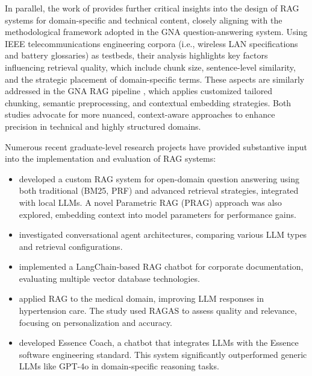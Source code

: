 \begin{spacing}{1.5}
In parallel, the work of \citep{soman_observations_2024} provides further critical insights into the design of RAG systems for domain-specific and technical content, closely aligning with the methodological framework adopted in the GNA question-answering system. Using IEEE telecommunications engineering corpora (i.e., wireless LAN specifications and battery glossaries) as testbeds, their analysis highlights key factors influencing retrieval quality, which include chunk size, sentence-level similarity, and the strategic placement of domain-specific terms. These aspects are similarly addressed in the GNA RAG pipeline \citep{pograri_question-answering_2025}, which applies customized tailored chunking, semantic preprocessing, and contextual embedding strategies. Both studies advocate for more nuanced, context-aware approaches to enhance precision in technical and highly structured domains.

Numerous recent graduate-level research projects have provided substantive input into the implementation and evaluation of RAG systems:
\begin{itemize}
    \item \textcite{antolini_experimental_2025} developed a custom RAG system for open-domain question answering using both traditional (BM25, PRF) and advanced retrieval strategies, integrated with local LLMs. A novel Parametric RAG (PRAG) approach was also explored, embedding context into model parameters for performance gains.
    \item \textcite{caramanna_progettazione_2024} investigated conversational agent architectures, comparing various LLM types and retrieval configurations.
    \item \textcite{florio_progettazione_2024} implemented a LangChain-based RAG chatbot for corporate documentation, evaluating multiple vector database technologies.
    \item \textcite{salcuni_utilizzo_2025} applied RAG to the medical domain, improving LLM responses in hypertension care. The study used RAGAS to assess quality and relevance, focusing on personalization and accuracy.
    \item \textcite{nicoletti_llms_2025} developed Essence Coach, a chatbot that integrates LLMs with the Essence software engineering standard. This system significantly outperformed generic LLMs like GPT-4o in domain-specific reasoning tasks.
\end{itemize}


\end{spacing}
